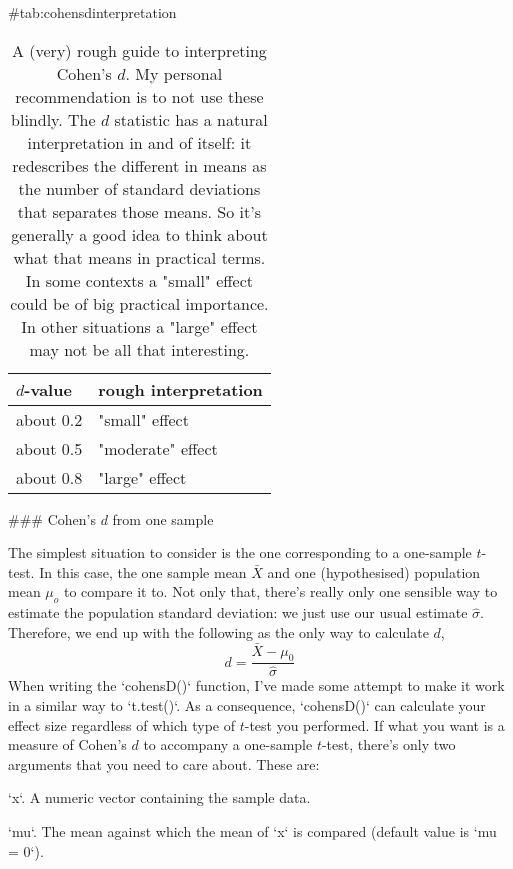 \begin{table}[t]
\caption{A (very) rough guide to interpreting Cohen's $d$. My personal recommendation is to not use these blindly. The $d$ statistic has a natural interpretation in and of itself: it redescribes the different in means as the number of standard deviations that separates those means. So it's generally a good idea to think about what that means in practical terms. In some contexts a "small" effect could be of big practical importance. In other situations a "large" effect may not be all that interesting.} 
{#tab:cohensdinterpretation}
\centering
\vspace*{6pt}
\begin{tabular}{l|l}
$d$-value & rough interpretation \\ \hline
about 0.2 & "small" effect  \\
about 0.5 & "moderate" effect \\
about 0.8 & "large" effect 
\end{tabular}
\vspace*{6pt}
\HR
\end{table}

### Cohen's $d$ from one sample

The simplest situation to consider is the one corresponding to a one-sample $t$-test. In this case, the one sample mean $\bar{X}$ and one (hypothesised) population mean $\mu_o$ to compare it to. Not only that, there's really only one sensible way to estimate the population standard deviation: we just use our usual estimate $\hat{\sigma}$. Therefore, we end up with the following as the only way to calculate $d$, 
$$
d = \frac{\bar{X} - \mu_0}{\hat{\sigma}}
$$
When writing the `cohensD()` function, I've made some attempt to make it work in a similar way to `t.test()`. As a consequence, `cohensD()` can calculate your effect size regardless of which type of $t$-test you performed. If what you want is a measure of Cohen's $d$ to accompany a one-sample $t$-test, there's only two arguments that you need to care about. These are:

\item `x`. A numeric vector containing the sample data.
\item `mu`. The mean against which the mean of `x` is compared (default value is `mu = 0`).

